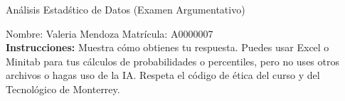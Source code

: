 \documentclass[8pt]{report}
\begin{document}
\newpage



\begin{center}
{An\'alisis Estad\'stico de Datos (Examen Argumentativo)}
\end{center}

Nombre: \underline{\hspace*{.2in}}
Valeria Mendoza
\underline{\hspace*{.2in}} \quad Matr\'icula:\underline{\hspace*{.2in}}
A0000007
\underline{\hspace*{.2in}} \\

{\bf Instrucciones:} Muestra c\'omo obtienes tu respuesta. Puedes usar Excel 
o Minitab para tus cálculos de probabilidades o 
percentiles, pero no uses otros archivos o hagas uso de la IA. Respeta el 
c\'odigo de \'etica del curso y del Tecnol\'ogico 
de Monterrey.
\end{document}
